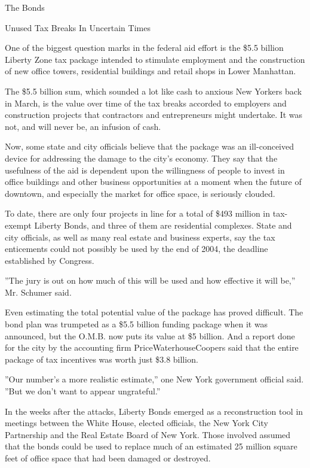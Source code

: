 The Bonds

Unused Tax Breaks In Uncertain Times

One of the biggest question marks in the federal aid effort is the \$5.5
billion Liberty Zone tax package intended to stimulate employment and
the construction of new office towers, residential buildings and retail
shops in Lower Manhattan.

The \$5.5 billion sum, which sounded a lot like cash to anxious New
Yorkers back in March, is the value over time of the tax breaks accorded
to employers and construction projects that contractors and
entrepreneurs might undertake. It was not, and will never be, an
infusion of cash.

Now, some state and city officials believe that the package was an
ill-conceived device for addressing the damage to the city's economy.
They say that the usefulness of the aid is dependent upon the
willingness of people to invest in office buildings and other business
opportunities at a moment when the future of downtown, and especially
the market for office space, is seriously clouded.

To date, there are only four projects in line for a total of \$493
million in tax-exempt Liberty Bonds, and three of them are residential
complexes. State and city officials, as well as many real estate and
business experts, say the tax enticements could not possibly be used by
the end of 2004, the deadline established by Congress.

''The jury is out on how much of this will be used and how effective it
will be,'' Mr. Schumer said.

Even estimating the total potential value of the package has proved
difficult. The bond plan was trumpeted as a \$5.5 billion funding
package when it was announced, but the O.M.B. now puts its value at \$5
billion. And a report done for the city by the accounting firm
PriceWaterhouseCoopers said that the entire package of tax incentives
was worth just \$3.8 billion.

''Our number's a more realistic estimate,'' one New York government
official said. ''But we don't want to appear ungrateful.''

In the weeks after the attacks, Liberty Bonds emerged as a
reconstruction tool in meetings between the White House, elected
officials, the New York City Partnership and the Real Estate Board of
New York. Those involved assumed that the bonds could be used to replace
much of an estimated 25 million square feet of office space that had
been damaged or destroyed.

